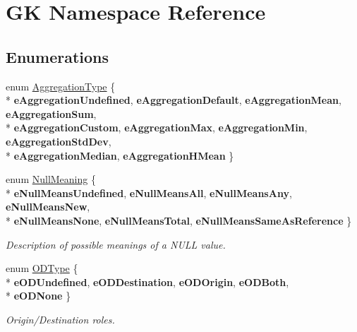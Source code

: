 \hypertarget{namespaceGK}{}\section{GK Namespace Reference}
\label{namespaceGK}
\subsection*{Enumerations}
\begin{DoxyCompactItemize}
\item 
enum \hyperlink{namespaceGK_ae682f9fb77047e45fa91c27e569b8fee}{Aggregation\+Type} \{ \\*
{\bfseries e\+Aggregation\+Undefined}, 
{\bfseries e\+Aggregation\+Default}, 
{\bfseries e\+Aggregation\+Mean}, 
{\bfseries e\+Aggregation\+Sum}, 
\\*
{\bfseries e\+Aggregation\+Custom}, 
{\bfseries e\+Aggregation\+Max}, 
{\bfseries e\+Aggregation\+Min}, 
{\bfseries e\+Aggregation\+Std\+Dev}, 
\\*
{\bfseries e\+Aggregation\+Median}, 
{\bfseries e\+Aggregation\+H\+Mean}
 \}
\item 
enum \hyperlink{namespaceGK_a6069947a18799ceb56e3593963a44edf}{Null\+Meaning} \{ \\*
{\bfseries e\+Null\+Means\+Undefined}, 
{\bfseries e\+Null\+Means\+All}, 
{\bfseries e\+Null\+Means\+Any}, 
{\bfseries e\+Null\+Means\+New}, 
\\*
{\bfseries e\+Null\+Means\+None}, 
{\bfseries e\+Null\+Means\+Total}, 
{\bfseries e\+Null\+Means\+Same\+As\+Reference}
 \}\hypertarget{namespaceGK_a6069947a18799ceb56e3593963a44edf}{}\label{namespaceGK_a6069947a18799ceb56e3593963a44edf}
\begin{DoxyCompactList}\small\item\em Description of possible meanings of a N\+U\+LL value. \end{DoxyCompactList}
\item 
enum \hyperlink{namespaceGK_a046daf4705db5aac14d3f998d1382a36}{O\+D\+Type} \{ \\*
{\bfseries e\+O\+D\+Undefined}, 
{\bfseries e\+O\+D\+Destination}, 
{\bfseries e\+O\+D\+Origin}, 
{\bfseries e\+O\+D\+Both}, 
\\*
{\bfseries e\+O\+D\+None}
 \}\hypertarget{namespaceGK_a046daf4705db5aac14d3f998d1382a36}{}\label{namespaceGK_a046daf4705db5aac14d3f998d1382a36}
\begin{DoxyCompactList}\small\item\em Origin/\+Destination roles. \end{DoxyCompactList}

\end{DoxyCompactItemize}
